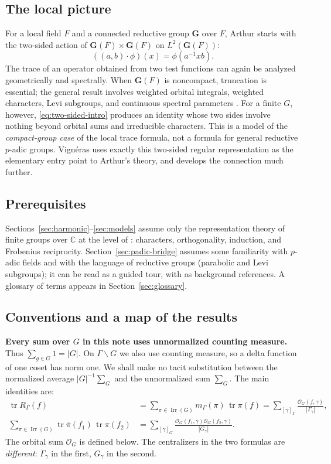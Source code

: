\documentclass[12pt]{article}
\theoremstyle{remark}
\newcommand{\C}{\mathbb C}
\newcommand{\tr}{\operatorname{tr}}
\newcommand{\Irr}{\operatorname{Irr}}
\newcommand{\Orb}{\mathcal O}
\begin{document}
\subsection{The local picture}
For a local field $F$ and a connected reductive group $\mathbf G$ over
$F$, Arthur starts with the two-sided action of
$\mathbf G(F)\times\mathbf G(F)$ on $L^2(\mathbf G(F))$:
\begin{equation}\label{eq:two-sided-intro}
 ((a,b)\cdot\phi)(x)=\phi(a^{-1}xb).
\end{equation}
The trace of an operator obtained from two test functions can again be
analyzed geometrically and spectrally.  When $\mathbf G(F)$ is noncompact,
truncation is essential; the general result involves weighted orbital
integrals, weighted characters, Levi subgroups, and continuous spectral
parameters \cite{ArthurTowards1989,ArthurLocal1991}.
For a finite $G$, however, \eqref{eq:two-sided-intro} produces an
identity whose two sides involve nothing beyond orbital sums and
irreducible characters.  This is a model of the \emph{compact-group
case} of the local trace formula, not a formula for general reductive
$p$-adic groups. Vign\'eras \cite[\S1.1]{Vigneras1991} uses exactly
this two-sided regular representation as the elementary entry point
to Arthur's theory, and develops the connection much further.

\subsection{Prerequisites}
Sections~\ref{sec:harmonic}--\ref{sec:models} assume only the
representation theory of finite groups over $\C$ at the level of
\cite[Part~I]{Serre}: characters, orthogonality, induction, and
Frobenius reciprocity.  Section~\ref{sec:padic-bridge} assumes some
familiarity with $p$-adic fields and with the language of reductive
groups (parabolic and Levi subgroups); it can be read as a guided tour,
with \cite{Casselman1995,Kottwitz2005} as background references.
A glossary of terms appears in Section~\ref{sec:glossary}.

\subsection{Conventions and a map of the results}
\textbf{Every sum over $G$ in this note uses unnormalized counting
measure.} Thus $\sum_{g\in G}1=|G|$.  On $\Gamma\backslash G$ we also
use counting measure, so a delta function of one coset has norm one.
We shall make no tacit substitution between the normalized average
$|G|^{-1}\sum_G$ and the unnormalized sum $\sum_G$.
The main identities are:
\begin{align}
 \tr R_\Gamma(f)
 &=\sum_{\pi\in\Irr(G)}m_\Gamma(\pi)\,\tr\pi(f)
  =\sum_{[\gamma]_\Gamma}
    \frac{\Orb_G(f,\gamma)}{|\Gamma_\gamma|},
 \label{eq:preview-global}\\
 \sum_{\pi\in\Irr(G)}
   \tr\bar\pi(f_1)\,\tr\pi(f_2)
 &=\sum_{[\gamma]_G}
    \frac{\Orb_G(f_1,\gamma)\Orb_G(f_2,\gamma)}{|G_\gamma|}.
 \label{eq:preview-local}
\end{align}
The orbital sum $\Orb_G$ is defined below. The centralizers in the
two formulas are \emph{different}: $\Gamma_\gamma$ in the first,
$G_\gamma$ in the second.
\end{document}
